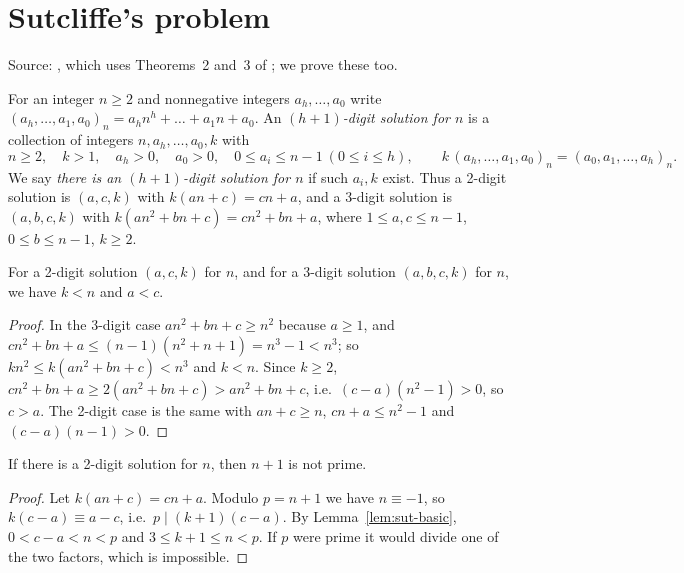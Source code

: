 \section{Sutcliffe's problem}\label{sec:arith}
Source: \cite{MathMag}, which uses Theorems~2 and~3 of \cite{Sut}; we prove these too.

\begin{definition}\label{def:sut-solution}
For an integer $n\ge2$ and nonnegative integers $a_h,\dots,a_0$ write
$(a_h,\dots,a_1,a_0)_n=a_hn^h+\dots+a_1n+a_0$. An \emph{$(h+1)$-digit solution for $n$} is a
collection of integers $n,a_h,\dots,a_0,k$ with
\[
  n\ge2,\quad k>1,\quad a_h>0,\quad a_0>0,\quad 0\le a_i\le n-1\ (0\le i\le h),\qquad
  k\,(a_h,\dots,a_1,a_0)_n=(a_0,a_1,\dots,a_h)_n .
\]
We say \emph{there is an $(h+1)$-digit solution for $n$} if such $a_i,k$ exist. Thus a 2-digit
solution is $(a,c,k)$ with $k(an+c)=cn+a$, and a 3-digit solution is $(a,b,c,k)$ with
$k(an^2+bn+c)=cn^2+bn+a$, where $1\le a,c\le n-1$, $0\le b\le n-1$, $k\ge2$.
\end{definition}

\begin{lemma}\label{lem:sut-basic}
For a 2-digit solution $(a,c,k)$ for $n$, and for a 3-digit solution $(a,b,c,k)$ for $n$, we have
$k<n$ and $a<c$.
\end{lemma}
\begin{proof}
In the 3-digit case $an^2+bn+c\ge n^2$ because $a\ge1$, and $cn^2+bn+a\le (n-1)(n^2+n+1)=n^3-1<n^3$;
so $kn^2\le k(an^2+bn+c)<n^3$ and $k<n$. Since $k\ge2$,
$cn^2+bn+a\ge 2(an^2+bn+c)>an^2+bn+c$, i.e.\ $(c-a)(n^2-1)>0$, so $c>a$. The 2-digit case is the
same with $an+c\ge n$, $cn+a\le n^2-1$ and $(c-a)(n-1)>0$.
\end{proof}

\begin{proposition}\label{prop:sut-two-composite}
If there is a 2-digit solution for $n$, then $n+1$ is not prime.
\end{proposition}
\begin{proof}
Let $k(an+c)=cn+a$. Modulo $p=n+1$ we have $n\equiv-1$, so $k(c-a)\equiv a-c$, i.e.\
$p\mid(k+1)(c-a)$. By Lemma~\ref{lem:sut-basic}, $0<c-a<n<p$ and $3\le k+1\le n<p$. If $p$ were
prime it would divide one of the two factors, which is impossible.
\end{proof}

